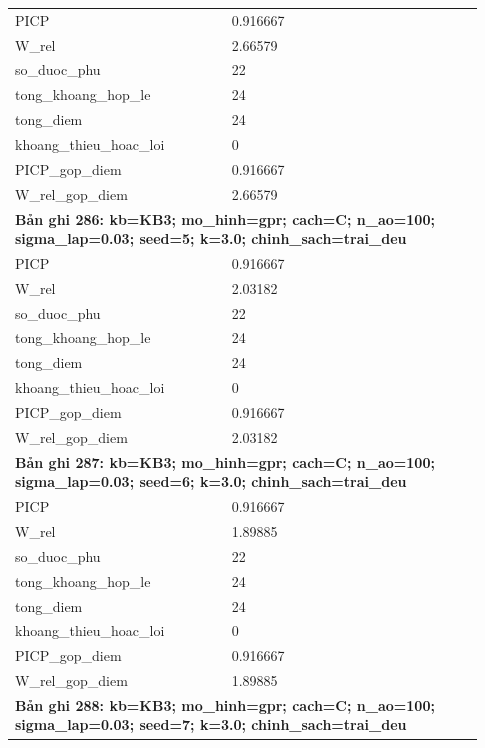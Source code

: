 \begin{longtable}{p{0.43\linewidth}p{0.50\linewidth}}
PICP & 0.916667 \\
W\_\allowbreak rel & 2.66579 \\
so\_\allowbreak duoc\_\allowbreak phu & 22 \\
tong\_\allowbreak khoang\_\allowbreak hop\_\allowbreak le & 24 \\
tong\_\allowbreak diem & 24 \\
khoang\_\allowbreak thieu\_\allowbreak hoac\_\allowbreak loi & 0 \\
PICP\_\allowbreak gop\_\allowbreak diem & 0.916667 \\
W\_\allowbreak rel\_\allowbreak gop\_\allowbreak diem & 2.66579 \\
\midrule
\multicolumn{2}{p{0.95\linewidth}}{\textbf{Bản ghi 286: kb=KB3; mo\_hinh=gpr; cach=C; n\_ao=100; sigma\_lap=0.03; seed=5; k=3.0; chinh\_sach=trai\_deu}} \\
PICP & 0.916667 \\
W\_\allowbreak rel & 2.03182 \\
so\_\allowbreak duoc\_\allowbreak phu & 22 \\
tong\_\allowbreak khoang\_\allowbreak hop\_\allowbreak le & 24 \\
tong\_\allowbreak diem & 24 \\
khoang\_\allowbreak thieu\_\allowbreak hoac\_\allowbreak loi & 0 \\
PICP\_\allowbreak gop\_\allowbreak diem & 0.916667 \\
W\_\allowbreak rel\_\allowbreak gop\_\allowbreak diem & 2.03182 \\
\midrule
\multicolumn{2}{p{0.95\linewidth}}{\textbf{Bản ghi 287: kb=KB3; mo\_hinh=gpr; cach=C; n\_ao=100; sigma\_lap=0.03; seed=6; k=3.0; chinh\_sach=trai\_deu}} \\
PICP & 0.916667 \\
W\_\allowbreak rel & 1.89885 \\
so\_\allowbreak duoc\_\allowbreak phu & 22 \\
tong\_\allowbreak khoang\_\allowbreak hop\_\allowbreak le & 24 \\
tong\_\allowbreak diem & 24 \\
khoang\_\allowbreak thieu\_\allowbreak hoac\_\allowbreak loi & 0 \\
PICP\_\allowbreak gop\_\allowbreak diem & 0.916667 \\
W\_\allowbreak rel\_\allowbreak gop\_\allowbreak diem & 1.89885 \\
\midrule
\multicolumn{2}{p{0.95\linewidth}}{\textbf{Bản ghi 288: kb=KB3; mo\_hinh=gpr; cach=C; n\_ao=100; sigma\_lap=0.03; seed=7; k=3.0; chinh\_sach=trai\_deu}} \\

\end{longtable}
